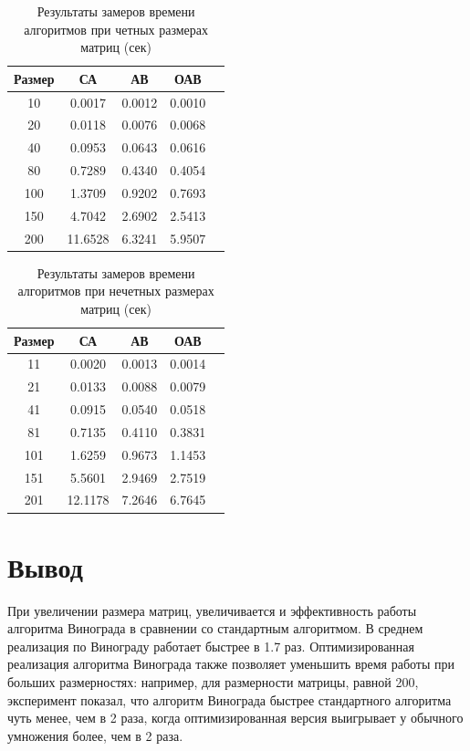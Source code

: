 \begin{table}[h]
	\begin{center}
		\caption{\label{tab:time1}Результаты замеров времени алгоритмов при четных размерах матриц (сек)}
		\begin{tabular}{|c|c|c|c|c|}
		\hline
		Размер & СА &  АВ & ОАВ \\
		\hline
		10  & 0.0017 & 0.0012 & 0.0010\\
		\hline
		20  & 0.0118 & 0.0076 & 0.0068\\
		\hline
		40  & 0.0953 & 0.0643 & 0.0616 \\
		\hline
		80  & 0.7289 & 0.4340 & 0.4054 \\
		\hline
		100  & 1.3709 & 0.9202 & 0.7693 \\
		\hline
		150  & 4.7042 & 2.6902 & 2.5413 \\
		\hline
		200  & 11.6528 & 6.3241 & 5.9507 \\
		\hline
		
		\end{tabular}
	\end{center}
\end{table}

\begin{table}[h]
	\begin{center}
		\caption{\label{tab:time2}Результаты замеров времени алгоритмов при нечетных размерах матриц (сек)}
		\begin{tabular}{|c|c|c|c|c|}
		\hline
		Размер & СА &  АВ & ОАВ \\
		\hline
		11  & 0.0020 & 0.0013 & 0.0014\\
		\hline
		21  & 0.0133 & 0.0088 & 0.0079\\
		\hline
		41  & 0.0915 & 0.0540 & 0.0518 \\
		\hline
		81  & 0.7135 & 0.4110 & 0.3831 \\
		\hline
		101  & 1.6259 & 0.9673 & 1.1453 \\
		\hline
		151  & 5.5601 & 2.9469 & 2.7519 \\
		\hline
		201  & 12.1178 & 7.2646 & 6.7645 \\
		\hline		
		\end{tabular}
	\end{center}
\end{table}


\section*{Вывод}
При увеличении размера матриц, увеличивается и эффективность работы алгоритма Винограда в сравнении со стандартным алгоритмом. В среднем реализация по Винограду работает быстрее в 1.7 раз. Оптимизированная реализация алгоритма Винограда также позволяет уменьшить время работы при больших размерностях: например, для размерности матрицы, равной 200, эксперимент показал, что алгоритм Винограда быстрее стандартного алгоритма чуть менее, чем в 2 раза, когда оптимизированная версия выигрывает у обычного умножения более, чем в 2 раза. 
